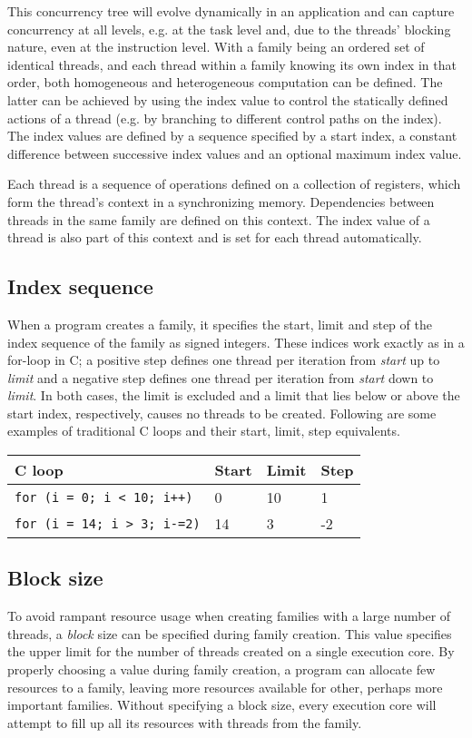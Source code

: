 This concurrency tree will evolve dynamically in an application and can capture concurrency at all levels, e.g. at the task level and, due to the threads' blocking nature, even at the instruction level. With a family being an ordered set of identical threads, and each thread within a family knowing its own index in that order, both homogeneous and heterogeneous computation can be defined. The latter can be achieved by using the index value to control the statically defined actions of a thread (e.g. by branching to different control paths on the index). The index values are defined by a sequence specified by a start index, a constant difference between successive index values and an optional maximum index value.

Each thread is a sequence of operations defined on a collection of registers, which form the thread's context in a synchronizing memory. Dependencies between threads in the same family are defined on this context. The index value of a thread is also part of this context and is set for each thread automatically.

\subsection{\label{sec:index-sequence}Index sequence}

When a program creates a family, it specifies the start, limit and step of the index sequence of the family as signed integers. These indices work exactly as in a for-loop in C; a positive step defines one thread per iteration from \emph{start} up to \emph{limit} and a negative step defines one thread per iteration from \emph{start} down to \emph{limit}. In both cases, the limit is excluded and a limit that lies below or above the start index, respectively, causes no threads to be created. Following are some examples of traditional C loops and their start, limit, step equivalents.

\vspace{1em}\noindent\begin{tabular}{l|l|l|l}
{\bf C loop} & {\bf Start} & {\bf Limit} & {\bf Step} \\
\hline
{\tt for (i = 0; i < 10; i++)} & 0 & 10 & 1 \\
{\tt for (i = 14; i > 3; i-=2)} & 14 & 3 & -2 \\
\end{tabular}

\subsection{Block size}
To avoid rampant resource usage when creating families with a large number of threads, a \emph{block} size can be specified during family creation. This value specifies the upper limit for the number of threads created on a single execution core. By properly choosing a value during family creation, a program can allocate few resources to a family, leaving more resources available for other, perhaps more important families. Without specifying a block size, every execution core will attempt to fill up all its resources with threads from the family.

